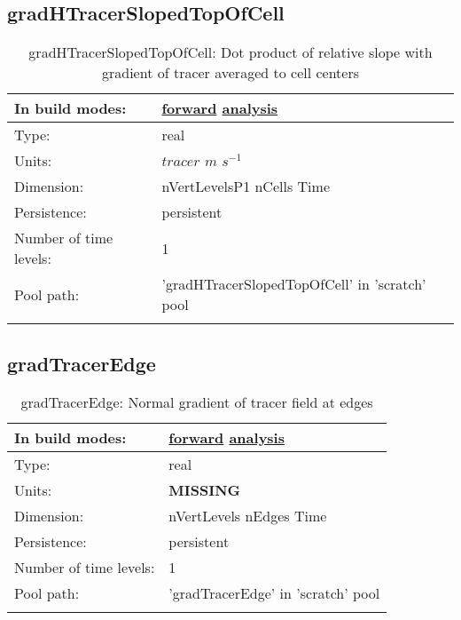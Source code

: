 \subsection[gradHTracerSlopedTopOfCell]{gradHTracerSlopedTopOfCell}
\label{subsec:var_sec_scratch_gradHTracerSlopedTopOfCell}
\begin{center}
\begin{longtable}{| p{2.0in} | p{4.0in} |}
        \hline 
        In build modes: & \hyperref[subsec:forward_var_tab_scratch]{forward} \hyperref[subsec:analysis_var_tab_scratch]{analysis} \\
        \hline 
        Type: & real \\
        \hline 
        Units: & $tracer$ $m$ $s^{-1}$ \\
        \hline 
        Dimension: & nVertLevelsP1 nCells Time \\
        \hline 
        Persistence: & persistent \\
        \hline 
        Number of time levels: & 1 \\
        \hline 
            Pool path: & 'gradHTracerSlopedTopOfCell' in 'scratch' pool
 \\
		 \hline 
    \caption{gradHTracerSlopedTopOfCell: Dot product of relative slope with gradient of tracer averaged to cell centers}
\end{longtable}
\end{center}
\subsection[gradTracerEdge]{gradTracerEdge}
\label{subsec:var_sec_scratch_gradTracerEdge}
\begin{center}
\begin{longtable}{| p{2.0in} | p{4.0in} |}
        \hline 
        In build modes: & \hyperref[subsec:forward_var_tab_scratch]{forward} \hyperref[subsec:analysis_var_tab_scratch]{analysis} \\
        \hline 
        Type: & real \\
        \hline 
        Units: & {\bf \color{red} MISSING} \\
        \hline 
        Dimension: & nVertLevels nEdges Time \\
        \hline 
        Persistence: & persistent \\
        \hline 
        Number of time levels: & 1 \\
        \hline 
            Pool path: & 'gradTracerEdge' in 'scratch' pool
 \\
		 \hline 
    \caption{gradTracerEdge: Normal gradient of tracer field at edges}
\end{longtable}
\end{center}

